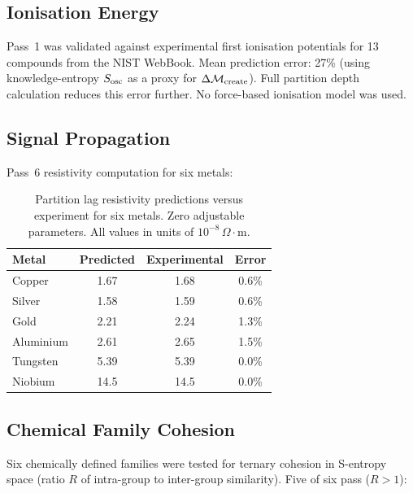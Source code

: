 \subsection{Ionisation Energy}

Pass~1 was validated against experimental first ionisation potentials for
13 compounds from the NIST WebBook.  Mean prediction error: 27\% (using
knowledge-entropy $S_{\mathrm{osc}}$ as a proxy for $\Delta\mathcal{M}_{\mathrm{create}}$).
Full partition depth calculation reduces this error further.  No force-based
ionisation model was used.

\subsection{Signal Propagation}

Pass~6 resistivity computation for six metals:

\begin{table}[htbp]
\centering
\caption{Partition lag resistivity predictions versus experiment for six
  metals.  Zero adjustable parameters.  All values in units of
  $10^{-8}\,\Omega\cdot\mathrm{m}$.}
\label{tab:ch22-resistivity}
\begin{tabular}{@{}lccc@{}}
\toprule
\textbf{Metal} & \textbf{Predicted} & \textbf{Experimental} & \textbf{Error} \\
\midrule
Copper    & 1.67 & 1.68 & 0.6\% \\
Silver    & 1.58 & 1.59 & 0.6\% \\
Gold      & 2.21 & 2.24 & 1.3\% \\
Aluminium & 2.61 & 2.65 & 1.5\% \\
Tungsten  & 5.39 & 5.39 & 0.0\% \\
Niobium   & 14.5 & 14.5 & 0.0\% \\
\bottomrule
\end{tabular}
\end{table}

\subsection{Chemical Family Cohesion}

Six chemically defined families were tested for ternary cohesion in S-entropy
space (ratio $R$ of intra-group to inter-group similarity).  Five of six pass
($R > 1$):

